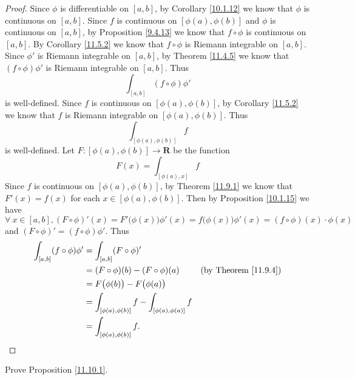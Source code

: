 \begin{proof}
    Since \(\phi\) is differentiable on \([a, b]\), by Corollary \ref{10.1.12} we know that \(\phi\) is continuous on \([a, b]\).
    Since \(f\) is continuous on \([\phi(a), \phi(b)]\) and \(\phi\) is continuous on \([a, b]\), by Proposition \ref{9.4.13} we know that \(f \circ \phi\) is continuous on \([a, b]\).
    By Corollary \ref{11.5.2} we know that \(f \circ \phi\) is Riemann integrable on \([a, b]\).
    Since \(\phi'\) is Riemann integrable on \([a, b]\), by Theorem \ref{11.4.5} we know that \((f \circ \phi) \phi'\) is Riemann integrable on \([a, b]\).
    Thus
    \[
        \int_{[a, b]} (f \circ \phi) \phi'
    \]
    is well-defined.
    Since \(f\) is continuous on \([\phi(a), \phi(b)]\), by Corollary \ref{11.5.2} we know that \(f\) is Riemann integrable on \([\phi(a), \phi(b)]\).
    Thus
    \[
        \int_{[\phi(a), \phi(b)]} f
    \]
    is well-defined.
    Let \(F : [\phi(a), \phi(b)] \to \mathbf{R}\) be the function
    \[
        F(x) = \int_{[\phi(a), x]} f
    \]
    Since \(f\) is continuous on \([\phi(a), \phi(b)]\), by Theorem \ref{11.9.1} we know that \(F'(x) = f(x)\) for each \(x \in [\phi(a), \phi(b)]\).
    Then by Proposition \ref{10.1.15} we have
    \[
        \forall\ x \in [a, b], (F \circ \phi)'(x) = F'\big(\phi(x)\big) \phi'(x) = f\big(\phi(x)\big) \phi'(x) = (f \circ \phi)(x) \cdot \phi(x)
    \]
    and \((F \circ \phi)' = (f \circ \phi) \phi'\).
    Thus
    \begin{align*}
        \int_{[a, b]} (f \circ \phi) \phi' & = \int_{[a, b]} (F \circ \phi)'                                                                \\
                                           & = (F \circ \phi)(b) - (F \circ \phi)(a)                     & \text{(by Theorem \ref{11.9.4})} \\
                                           & = F\big(\phi(b)\big) - F\big(\phi(a)\big)                                                      \\
                                           & = \int_{[\phi(a), \phi(b)]} f - \int_{[\phi(a), \phi(a)]} f                                    \\
                                           & = \int_{[\phi(a), \phi(b)]} f.
    \end{align*}
\end{proof}

\exercisesection

\begin{exercise}\label{ex 11.10.1}
    Prove Proposition \ref{11.10.1}.
\end{exercise}

